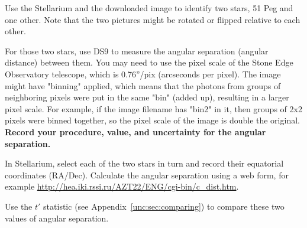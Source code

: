 \begin{steps}
	\item Use the Stellarium and the downloaded image to identify two stars, 51 Peg and one other. Note that the two pictures might be rotated or flipped relative to each other.
	
	\item For those two stars, use DS9 to measure the angular separation (angular distance) between them. You may need to use the pixel scale of the Stone Edge Observatory telescope, which is 0.76''/pix (arcseconds per pixel). The image might have "binning" applied, which means that the photons from groups of neighboring pixels were put in the same "bin" (added up), resulting in a larger pixel scale. For example, if the image filename has "bin2" in it, then groups of 2x2 pixels were binned together, so the pixel scale of the image is double the original. \textbf{Record your procedure, value, and uncertainty for the angular separation.}
	
	\item In Stellarium, select each of the two stars in turn and record their equatorial coordinates (RA/Dec). Calculate the angular separation using a web form, for example \url{http://hea.iki.rssi.ru/AZT22/ENG/cgi-bin/c_dist.htm}.
	
	\item Use the $t'$ statistic (see Appendix\ \ref{unc:sec:comparing}) to compare these two values of angular separation.
	
	
\end{steps}



